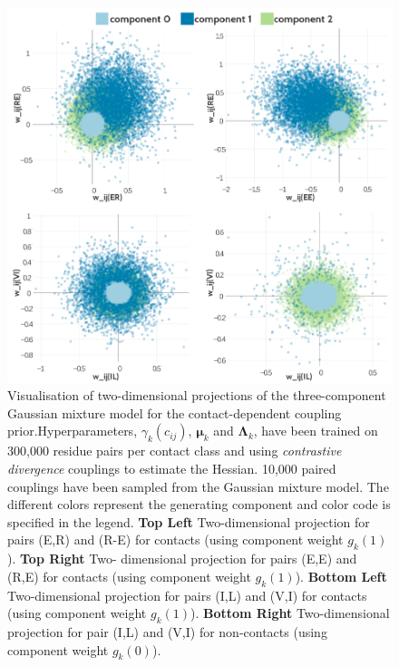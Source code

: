 \documentclass[11pt,a4paper,twoside]{book}
\newcommand{\Lk}{\mathbf{\Lambda}_k}
\newcommand{\muk}{\mathbf{\mu}_k}
\newcommand{\cij}{c_{ij}}
\theoremstyle{definition}
\theoremstyle{definition}
\theoremstyle{remark}
\begin{document}
\begin{figure}
\includegraphics[width=1\linewidth]{img/bayesian_model/cd/3/2dvis_combined_100k} \caption{Visualisation of two-dimensional
projections of the three-component Gaussian mixture model for the
contact-dependent coupling prior.Hyperparameters, \(\gamma_k(\cij)\),
\(\muk\) and \(\Lk\), have been trained on 300,000 residue pairs per
contact class and using \emph{contrastive divergence} couplings to
estimate the Hessian. 10,000 paired couplings have been sampled from the
Gaussian mixture model. The different colors represent the generating
component and color code is specified in the legend. \textbf{Top Left}
Two-dimensional projection for pairs (E,R) and (R-E) for contacts (using
component weight \(g_k(1)\)). \textbf{Top Right} Two- dimensional
projection for pairs (E,E) and (R,E) for contacts (using component
weight \(g_k(1)\)). \textbf{Bottom Left} Two-dimensional projection for
pairs (I,L) and (V,I) for contacts (using component weight \(g_k(1)\)).
\textbf{Bottom Right} Two-dimensional projection for pair (I,L) and
(V,I) for non-contacts (using component weight \(g_k(0)\)).}\label{fig:vis2d-cd-3comp-100k}
\end{figure}
\end{document}
